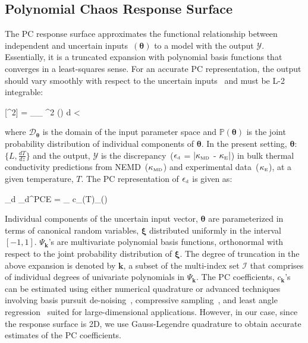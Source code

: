 \subsection{Polynomial Chaos Response Surface}

The PC response surface approximates the functional relationship between independent
and uncertain 
inputs~$(\bm{\theta})$ to a model with the output $\mathcal{Y}$. Essentially, it is a truncated expansion with polynomial 
basis functions that converges in a least-squares sense. For an accurate PC representation, the output should
vary smoothly with respect to the uncertain inputs~\cite{Vohra:2014}  and must
be L-2 integrable:

\be
{}[^2] = \int_{_{\bm{\theta}}} ^2 (\bm{\theta}) 
d\bm{\theta} < \infty
\ee

\noindent where $\mathcal{D}_{\bm{\theta}}$ is the domain of the input parameter space and 
$\mathbb{P}(\bm{\theta})$ is the joint probability distribution of individual components of $\bm{\theta}$.
In the present setting, $\bm{\theta}$:~$\{L,\frac{dT}{dz}\}$ and the output, $\mathcal{Y}$ is the
discrepancy~($\epsilon_{\mbox{\tiny{d}}}$ = 
$\lvert\kappa_{\mbox{\tiny{MD}}}$ - $\kappa_{\mbox{\tiny{E}}}\rvert$)
in bulk thermal conductivity predictions from 
NEMD~($\kappa_{\mbox{\tiny{MD}}}$) and experimental data~($\kappa_{\mbox{\tiny{E}}}$), at a 
given temperature, $T$. The PC representation of $\epsilon_{\mbox{\tiny{d}}}$ is given as:

\be
\epsilon_{\mbox{\tiny{d}}} \approx \mathcal{\epsilon}_{\mbox{\tiny{d}}}^{\mbox{\tiny{PCE}}} = 
\sum_{\in{}} c_{}(T)\Psi_{}(\bm{\xi(\theta)}) 
\ee

\noindent Individual components of the uncertain input vector, $\bm{\theta}$ are parameterized in terms of canonical random 
variables, $\bm{\xi}$ distributed uniformly in the interval $[-1,1]$. 
 $\Psi_{\bm{k}}$'s are multivariate polynomial basis functions, orthonormal with respect to the joint probability 
 distribution of $\bm{\xi}$. The degree of truncation in the above expansion is denoted by $\bm{k}$, a subset of
 the multi-index set $\mathcal{I}$ that comprises of individual degrees of univariate polynomials in $\Psi_{\bm{k}}$.
The PC coefficients, $c_{\bm{k}}$'s can be estimated using either numerical quadrature or advanced techniques
involving basis pursuit de-noising~\cite{Peng:2014}, compressive
sampling~\cite{Hampton:2015}, and least angle regression~\cite{Blatman:2011} suited for large-dimensional
applications. However, in our case, since the response surface is 2D, we use Gauss-Legendre quadrature to
obtain accurate estimates of the PC coefficients. 
\bigskip

